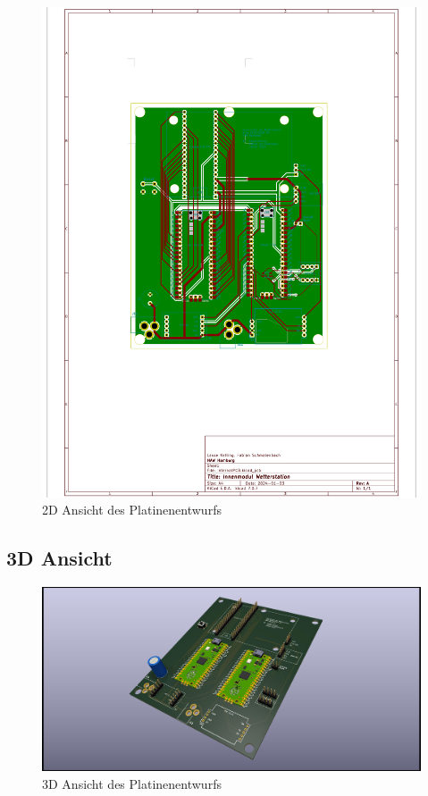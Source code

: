 \documentclass[a4paper,11pt]{article}
\begin{document}
\begin{figure}[H]
  \centering
  \includegraphics[scale=0.7, page=1]{PCBIntern.pdf}
  \caption{2D Ansicht des Platinenentwurfs}
  \label{pdf:platineIntern}
\end{figure}

\clearpage
\subsection{3D Ansicht}

\begin{figure}[H]
  \centering
  \includegraphics[width=\textwidth]{InternalPCB3D.jpg}
  \caption{3D Ansicht des Platinenentwurfs}
  \label{fig:platineIntern3D}
\end{figure}
\end{document}
